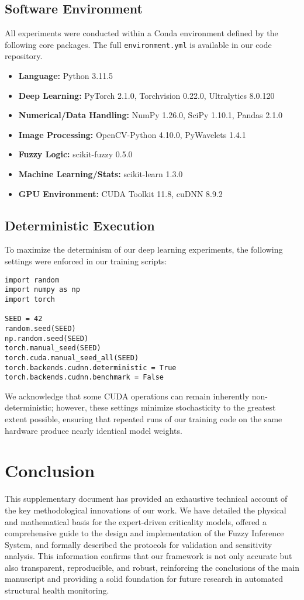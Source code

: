 \documentclass[energies,supfile,submit,pdftex,moreauthors]{Definitions/mdpi}
\begin{document}
\subsection{Software Environment}
All experiments were conducted within a Conda environment defined by the following core packages. The full \texttt{environment.yml} is available in our code repository.
\begin{itemize}
    \item \textbf{Language:} Python 3.11.5
    \item \textbf{Deep Learning:} PyTorch 2.1.0, Torchvision 0.22.0, Ultralytics 8.0.120
    \item \textbf{Numerical/Data Handling:} NumPy 1.26.0, SciPy 1.10.1, Pandas 2.1.0
    \item \textbf{Image Processing:} OpenCV-Python 4.10.0, PyWavelets 1.4.1
    \item \textbf{Fuzzy Logic:} scikit-fuzzy 0.5.0
    \item \textbf{Machine Learning/Stats:} scikit-learn 1.3.0
    \item \textbf{GPU Environment:} CUDA Toolkit 11.8, cuDNN 8.9.2
\end{itemize}

\subsection{Deterministic Execution}
To maximize the determinism of our deep learning experiments, the following settings were enforced in our training scripts:
\begin{verbatim}
import random
import numpy as np
import torch

SEED = 42
random.seed(SEED)
np.random.seed(SEED)
torch.manual_seed(SEED)
torch.cuda.manual_seed_all(SEED)
torch.backends.cudnn.deterministic = True
torch.backends.cudnn.benchmark = False
\end{verbatim}

We acknowledge that some CUDA operations can remain inherently non-deterministic; however, these settings minimize stochasticity to the greatest extent possible, ensuring that repeated runs of our training code on the same hardware produce nearly identical model weights.

\section{Conclusion}
This supplementary document has provided an exhaustive technical account of the key methodological innovations of our work. We have detailed the physical and mathematical basis for the expert-driven criticality models, offered a comprehensive guide to the design and implementation of the Fuzzy Inference System, and formally described the protocols for validation and sensitivity analysis. This information confirms that our framework is not only accurate but also transparent, reproducible, and robust, reinforcing the conclusions of the main manuscript and providing a solid foundation for future research in automated structural health monitoring.
\end{document}
